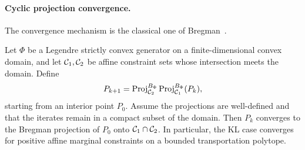 \paragraph{Cyclic projection convergence.}

The convergence mechanism is the classical one of Bregman~\cite{bregman1967relaxation}.

\begin{prop}\label{prop-cyclic-kl-affine}
	Let $\Phi$ be a Legendre strictly convex generator on a finite-dimensional convex domain, and let $\mathcal{C}_1,\mathcal{C}_2$ be affine constraint sets whose intersection meets the domain. Define
	\[
		P_{k+1}
		=
		\operatorname{Proj}_{\mathcal{C}_2}^{B_\Phi}
		\operatorname{Proj}_{\mathcal{C}_1}^{B_\Phi}(P_k),
	\]
	starting from an interior point $P_0$. Assume the projections are well-defined and that the iterates remain in a compact subset of the domain. Then $P_k$ converges to the Bregman projection of $P_0$ onto $\mathcal{C}_1\cap\mathcal{C}_2$. In particular, the KL case converges for positive affine marginal constraints on a bounded transportation polytope.
\end{prop}
